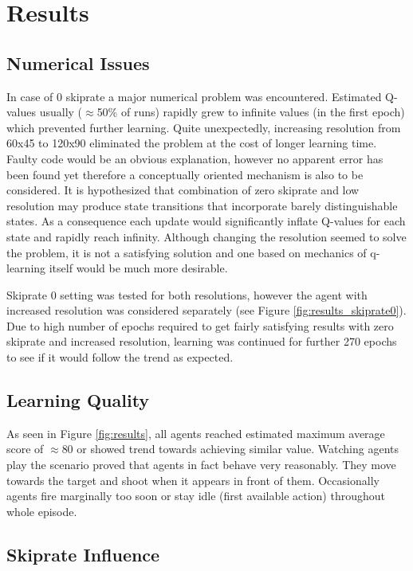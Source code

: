\section{Results}
	\subsection{Numerical Issues}
		In case of 0 skiprate a major numerical problem was encountered. Estimated Q-values usually ($\approx$50\% of runs) rapidly grew to infinite values (in the first epoch) which prevented further learning. Quite unexpectedly, increasing resolution from 60x45 to 120x90 eliminated the problem at the cost of longer learning time. Faulty code would be an obvious explanation, however no apparent error has been found yet therefore a conceptually oriented mechanism is also to be considered. It is hypothesized that combination of zero skiprate and low resolution may produce state transitions that incorporate barely distinguishable states. As a consequence each update would significantly inflate Q-values for each state and rapidly reach infinity. Although changing the resolution seemed to solve the problem, it is not a satisfying solution and one based on mechanics of q-learning itself would be much more desirable.

		Skiprate 0 setting was tested for both resolutions, however the agent with increased resolution was considered separately (see Figure \ref{fig:results_skiprate0}). Due to high number of epochs required to get fairly satisfying results with zero skiprate and increased resolution, learning was continued for further 270 epochs to see if it would follow the trend as expected.

	\subsection{Learning Quality}
		As seen in Figure \ref{fig:results}, all agents reached estimated maximum average score of $\approx$80 or showed trend towards achieving similar value. Watching agents play the scenario proved that agents in fact behave very reasonably. They move towards the target and shoot when it appears in front of them. Occasionally agents fire marginally too soon or stay idle (first available action) throughout whole episode. 

	\subsection{Skiprate Influence}
		
